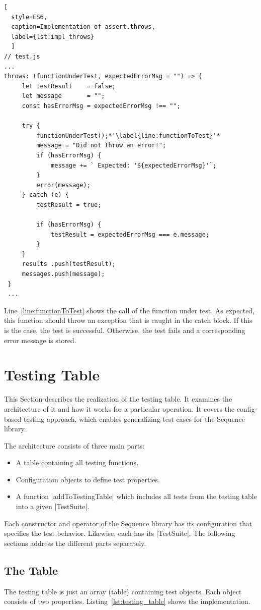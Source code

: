 \begin{lstlisting}[
  style=ES6, 
  caption=Implementation of assert.throws,
  label={lst:impl_throws}
  ]
// test.js
...
throws: (functionUnderTest, expectedErrorMsg = "") => {
     let testResult    = false;
     let message       = "";
     const hasErrorMsg = expectedErrorMsg !== "";

     try {
         functionUnderTest();*'\label{line:functionToTest}'*
         message = "Did not throw an error!";
         if (hasErrorMsg) {
             message += ` Expected: '${expectedErrorMsg}'`;
         }
         error(message);
     } catch (e) {
         testResult = true;

         if (hasErrorMsg) {
             testResult = expectedErrorMsg === e.message;
         }
     }
     results .push(testResult);
     messages.push(message);
 }
 ...
\end{lstlisting}


Line~\ref{line:functionToTest} shows the call of the function under test. As
expected, this function should throw an exception that is caught in the catch
block. If this is the case, the test is successful. Otherwise, the test fails
and a corresponding error message is stored.

\section{Testing Table}
\label{sec:Testing Table}
This Section describes the realization of the testing table. It examines the
architecture of it and how it works for a particular operation. It covers the
config-based testing approach, which enables generalizing test cases for the
Sequence library.

The architecture consists of three main parts:
\begin{itemize}
  \item{A table containing all testing functions.}
  \item{Configuration objects to define test properties.}
  \item{A function |addToTestingTable| which includes all tests from the testing
    table into a given |TestSuite|.}
\end{itemize}

Each constructor and operator of the Sequence library has its configuration
that specifies the test behavior. Likewise, each has its |TestSuite|. 
The following sections address the different parts separately.

\subsection{The Table}
\label{sub:The Table}
The testing table is just an array (table) containing test objects.
Each object consists of two properties. Listing~\ref{lst:testing_table} shows
the implementation.

